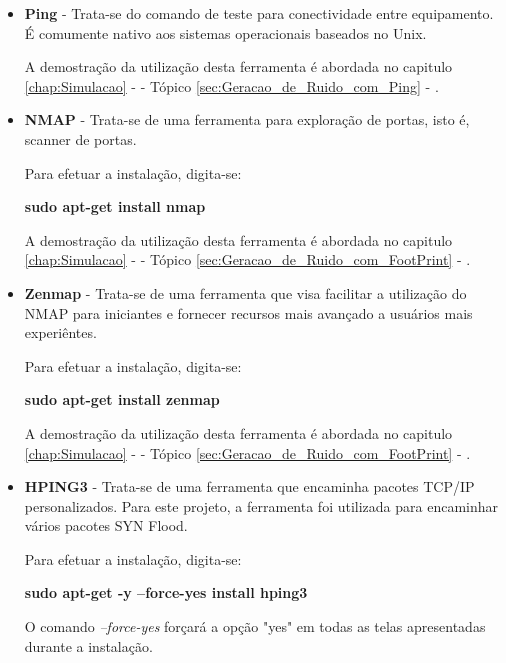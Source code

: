 			\begin{itemize}

				\item \textbf{Ping} - Trata-se do comando de teste para conectividade entre equipamento. É comumente nativo aos sistemas operacionais baseados no Unix.

				A demostração da utilização desta ferramenta é abordada no capitulo \ref{chap:Simulacao} -  - Tópico \ref{sec:Geracao_de_Ruido_com_Ping} - .


				\item \textbf{NMAP} - Trata-se de uma ferramenta para exploração de portas, isto é, scanner de portas. \cite{nmap}

				Para efetuar a instalação, digita-se:
				\begin{framed}
					\textbf{sudo apt-get install nmap}
				\end{framed}

				A demostração da utilização desta ferramenta é abordada no capitulo \ref{chap:Simulacao} -  - Tópico \ref{sec:Geracao_de_Ruido_com_FootPrint} - .


				\item \textbf{Zenmap} - Trata-se de uma ferramenta que visa facilitar a utilização do NMAP para iniciantes e fornecer recursos mais avançado a usuários mais experiêntes. \cite{zenmap}

				Para efetuar a instalação, digita-se:
				\begin{framed}
					\textbf{sudo apt-get install zenmap}
				\end{framed}

				A demostração da utilização desta ferramenta é abordada no capitulo \ref{chap:Simulacao} -  - Tópico \ref{sec:Geracao_de_Ruido_com_FootPrint} - .


				\item \textbf{HPING3} - Trata-se de uma ferramenta que encaminha pacotes TCP/IP personalizados. Para este projeto, a ferramenta foi utilizada para encaminhar vários pacotes SYN Flood.

				Para efetuar a instalação, digita-se:
				\begin{framed}
					\textbf{sudo apt-get -y --force-yes install hping3}
				\end{framed}

				O comando \emph{--force-yes} forçará a opção "yes" em todas as telas apresentadas durante a instalação.


\end{itemize}
